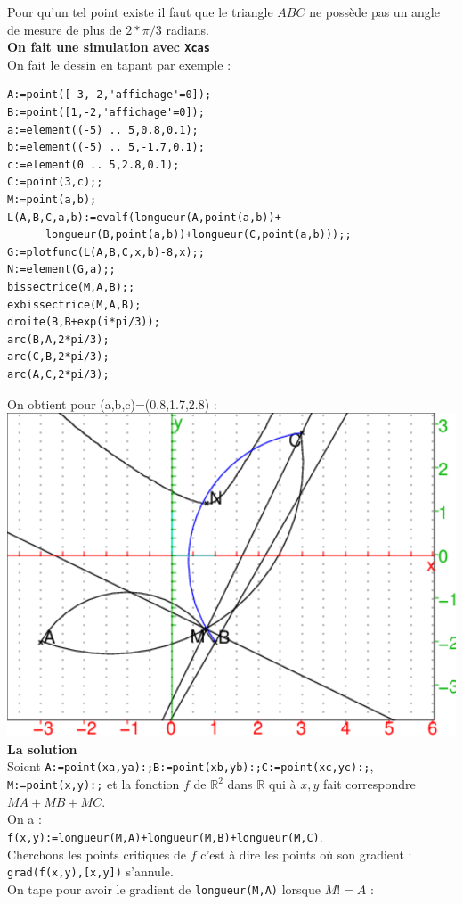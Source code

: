 \documentclass[a4paper,11pt]{book}
\newcommand{\R}{{\mathbb{R}}}
\begin{document}
Pour qu'un tel point existe il faut que le triangle $ABC$ ne poss\`ede pas un 
angle de mesure de plus de $2*\pi/3$ radians.\\
{\bf On fait une simulation avec {\tt Xcas}}\\
On fait le dessin en tapant par exemple :
\begin{verbatim}
A:=point([-3,-2,'affichage'=0]);
B:=point([1,-2,'affichage'=0]);
a:=element((-5) .. 5,0.8,0.1);
b:=element((-5) .. 5,-1.7,0.1);
c:=element(0 .. 5,2.8,0.1);
C:=point(3,c);;
M:=point(a,b);
L(A,B,C,a,b):=evalf(longueur(A,point(a,b))+
      longueur(B,point(a,b))+longueur(C,point(a,b)));;
G:=plotfunc(L(A,B,C,x,b)-8,x);;
N:=element(G,a);;
bissectrice(M,A,B);;
exbissectrice(M,A,B);
droite(B,B+exp(i*pi/3));
arc(B,A,2*pi/3);
arc(C,B,2*pi/3);
arc(A,C,2*pi/3);
\end{verbatim}
On obtient pour (a,b,c)=(0.8,1.7,2.8) :\\
\includegraphics[width=\textwidth]{mabc}\\
{\bf La solution}\\
Soient {\tt A:=point(xa,ya):;B:=point(xb,yb):;C:=point(xc,yc):;},
{\tt M:=point(x,y):;} et la fonction $f$ de $\R^2$ dans $\R$ qui \`a $x,y$ fait 
correspondre $MA+MB+MC$.\\
On a :\\
{\tt f(x,y):=longueur(M,A)+longueur(M,B)+longueur(M,C)}.\\
Cherchons les points critiques de $f$ c'est \`a dire les points o\`u 
son gradient :\\
{\tt grad(f(x,y),[x,y])} s'annule.\\
On tape pour avoir le gradient de {\tt longueur(M,A)} lorsque $M!=A$ :\\
\end{document}
